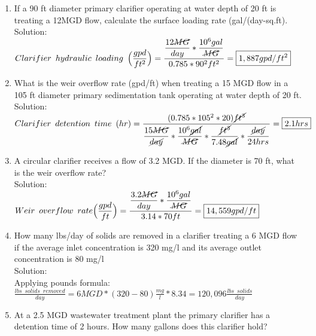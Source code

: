 \begin{enumerate}
\item If a 90 ft diameter primary clarifier operating at water depth of 20 ft is treating a 12MGD flow, calculate the surface loading rate (gal/(day-sq.ft).\\
Solution:\\
$Clarifier \enspace hydraulic \enspace loading \enspace 	\Big(\dfrac{gpd}{ft^2}\Big) =\dfrac{\dfrac{12\cancel{MG}}{{day}}*\dfrac{10^6gal}{\cancel{MG}}}{0.785*90^2 ft^2}=\boxed{1,887gpd/ft^2}$\\


\vspace{0.25cm}
\item What is the weir overflow rate (gpd/ft) when treating a 15 MGD flow in a 105 ft diameter primary sedimentation tank operating at water depth of 20 ft.\\
\vspace{0.25cm}
Solution:\\
\vspace{0.25cm}
$Clarifier \enspace detention \enspace time \enspace (hr) = 	\dfrac{(0.785*105^2*20)\cancel{ft^3}}{\dfrac{15\cancel{MG}}{\cancel{day}}*\dfrac{10^6\cancel{gal}}{\cancel{MG}}*\dfrac{\cancel{ft^3}}{7.48\cancel{gal}}*\dfrac{\cancel{day}}{24hrs}}=\boxed{2.1hrs}$\\

\item A circular clarifier receives a flow of 3.2 MGD. If the diameter is 70 ft, what is the weir overflow rate?\\
Solution:\\
$Weir \enspace overflow \enspace rate \Big(\dfrac{gpd}{ft}\Big) =\dfrac{\dfrac{3.2\cancel{MG}}{{day}}*\dfrac{10^6gal}{\cancel{MG}}}{3.14*70 ft}=\boxed{14,559gpd/ft}$\\ 


\vspace{0.25cm}
\item How many lbs/day of solids are removed in a clarifier treating a 6 MGD flow if the average inlet concentration is 320 mg/l and its average outlet concentration is 80 mg/l\\
\vspace{0.25cm}
Solution:\\
\vspace{0.25cm}
Applying pounds formula:\\
$\frac{lbs \enspace solids \enspace removed}{day}=6MGD*(320-80)\frac{mg}{l}*8.34=\boxed{120,096\frac{lbs \enspace solids}{day}}$

\vspace{0.25cm}
\item At a 2.5 MGD wastewater treatment plant the primary clarifier has a detention time of 2 hours. How many gallons does this clarifier hold?\\


\end{enumerate}
